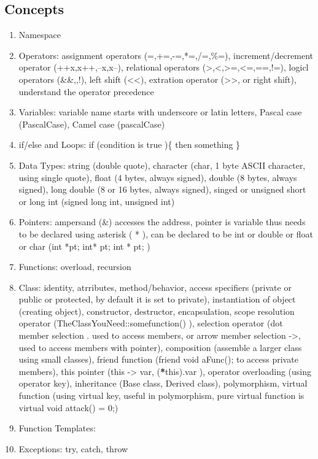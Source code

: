 \documentclass[letterpaper,12pt,english]{sphinxmanual}
\begin{document}
\subsection{Concepts}
\label{\detokenize{cpp/basics:concepts}}\begin{enumerate}
\item {} 
Namespace

\item {} 
Operators: assignment operators (=,+=,-=,*=,/=,\%=), increment/decrement operator (++x,x++,--x,x--), relational operators (\textgreater{},\textless{},\textgreater{}=,\textless{}=,==,!=), logicl operators (\&\&,\textbar{}\textbar{},!), left shift (\textless{}\textless{}), extration operator (\textgreater{}\textgreater{}, or right shift), understand the operator precedence

\item {} 
Variables: variable name starts with underscore or latin letters, Pascal case (PascalCase), Camel case (pascalCase)

\item {} 
if/else and Loops: if (condition is true )\{ then something \}

\item {} 
Data Types: string (double quote), character (char, 1 byte ASCII character, using single quote), float (4 bytes, always signed), double (8 bytes, always signed), long double (8 or 16 bytes, always signed), singed or unsigned short or long int (signed long int, unsigned int)

\item {} 
Pointers: ampersand (\&) accesses the address, pointer is variable thus needs to be declared using asterisk ( * ), can be declared to be int or double or float or char (int *pt; int* pt; int * pt; )

\item {} 
Functions: overload, recursion

\item {} 
Class: identity, atrributes, method/behavior, access specifiers (private or public or protected, by default it is set to private), instantiation of object (creating object), constructor, destructor, encapsulation, scope resolution operator (TheClassYouNeed::somefunction() ), selection operator (dot member selection . used to access members, or arrow member selection -\textgreater{}, used to access members with pointer), composition (assemble a larger class using small classes), friend function (friend void aFunc(); to access private members), this pointer (this -\textgreater{} var, ({\color{red}\bfseries{}*}this).var ), operator overloading (using operator key), inheritance (Base class, Derived class), polymorphism, virtual function (using virtual key, useful in polymorphism, pure virtual function is virtual void attack() = 0;)

\item {} 
Function Templates:

\item {} 
Exceptions: try, catch, throw

\end{enumerate}
\end{document}
